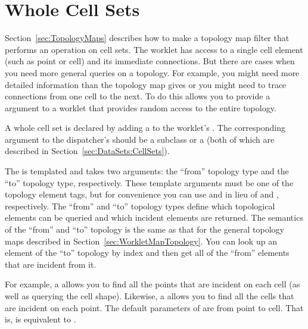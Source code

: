 

\section{Whole Cell Sets}
\label{sec:WholeCellSets}


Section~\ref{sec:TopologyMaps} describes how to make a topology map filter that performs an operation on cell sets.
The worklet has access to a single cell element (such as point or cell) and its immediate connections.
But there are cases when you need more general queries on a topology.
For example, you might need more detailed information than the topology map gives or you might need to trace connections from one cell to the next.
To do this \VTKm allows you to provide a  argument to a worklet that provides random access to the entire topology.

A whole cell set is declared by adding a  to the worklet's \controlsignature.
The corresponding argument to the dispatcher's  should be a  subclass or a  (both of which are described in Section~\ref{sec:DataSets:CellSets}).

The  is templated and takes two arguments: the ``from'' topology type and the ``to'' topology type, respectively.
These template arguments must be one of the topology element tags, but for convenience you can use  and  in lieu of  and , respectively.
The ``from'' and ``to'' topology types define which topological elements can be queried and which incident elements are returned.
The semantics of the ``from'' and ``to'' topology is the same as that for the general topology maps described in Section~\ref{sec:WorkletMapTopology}.
You can look up an element of the ``to'' topology by index and then get all of the ``from'' elements that are incident from it.

For example, a  allows you to find all the points that are incident on each cell (as well as querying the cell shape). Likewise, a  allows you to find all the cells that are incident on each point.
The default parameters of  are from point to cell.
That is, \tparams{} is equivalent to .

